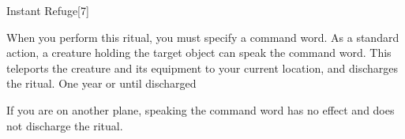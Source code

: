 \begin{spellsection}{Instant Refuge}[7]
    \begin{spellheader}
    \end{spellheader}
    \begin{spellcontent}
        \begin{spelltargetinginfo}
        \end{spelltargetinginfo}
        \begin{spelleffects}
            \spellspecial When you perform this ritual, you must specify a command word.
            \spelleffect As a standard action, a creature holding the target object can speak the command word. This teleports the creature and its equipment to your current location, and discharges the ritual.
            \spelldur One year or until discharged
        \end{spelleffects}
    \end{spellcontent}
    \begin{spellfooter}
        \spellnotes If you are on another plane, speaking the command word has no effect and does not discharge the ritual.
    \end{spellfooter}
    \begin{spellaugments}
    \end{spellaugments}
\end{spellsection}

